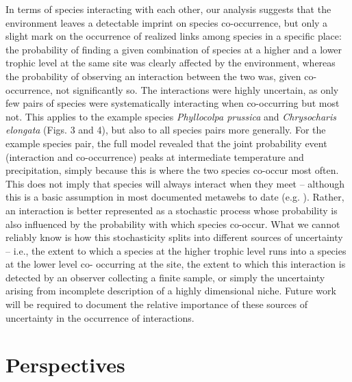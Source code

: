 \documentclass[12pt]{article}
\begin{document}
In terms of species interacting with each other, our analysis suggests that
the environment leaves a detectable imprint on species co-occurrence, but only
a slight mark on the occurrence of realized links among species in a specific
place: the probability of finding a given combination of species at a higher
and a lower trophic level at the same site was clearly affected by the
environment, whereas the probability of observing an interaction between the
two was, given co-occurrence, not significantly so. The interactions were
highly uncertain, as only few pairs of species were systematically interacting
when co-occurring but most not. This applies to the example species
\textit{Phyllocolpa prussica} and \textit{Chrysocharis elongata} (Figs. 3 and
4), but also to all species pairs more generally. For the example species
pair, the full model revealed that the joint probability event (interaction
and co-occurrence) peaks at intermediate temperature and precipitation, simply
because this is where the two species co-occur most often. This does not imply
that species will always interact when they meet – although this is a basic
assumption in most documented metawebs to date (e.g. \citealt{Havens1992,
Wood2015}). Rather, an interaction is better represented as a stochastic
process whose probability is also influenced by the probability with which
species co-occur. What we cannot reliably know is how this stochasticity
splits into different sources of uncertainty – i.e., the extent to which a
species at the higher trophic level runs into a species at the lower level co-
occurring at the site, the extent to which this interaction is detected by an
observer collecting a finite sample, or simply the uncertainty arising from
incomplete description of a highly dimensional niche. Future work will be
required to document the relative importance of these sources of uncertainty
in the occurrence of interactions.

\section*{Perspectives}
\end{document}
